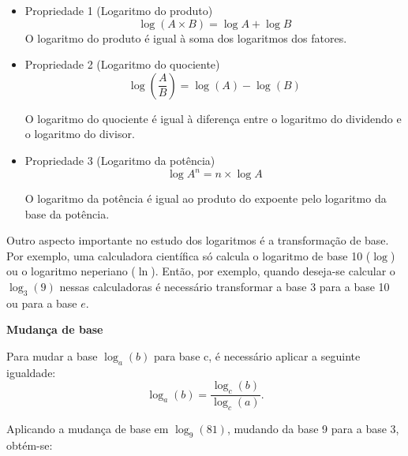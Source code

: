 	\begin{itemize}
		\item Propriedade 1 (Logaritmo do produto)
		\[
        \log (A \times B) = \log A + \log B
        \]
		O logaritmo do produto é igual à soma dos logaritmos dos fatores. 

        \begin{texample}
        \centering
        \end{texample}
       
		\item Propriedade 2 (Logaritmo do quociente)
		\[
        \log \left(\frac{A}{B}\right) = \log (A) - \log (B)
        \]
		
		O logaritmo do quociente é igual à diferença entre o logaritmo do dividendo e o logaritmo do divisor.
  
	  \begin{texample}
        \centering
        \end{texample}
        
		\item Propriedade 3 (Logaritmo da potência)
		\[
        \log A^n = n \times \log A
        \]
		
		O logaritmo da potência é igual ao produto do expoente pelo logaritmo da base da potência.

        \begin{texample}
        \centering
        \end{texample}
        
	\end{itemize}
	Outro aspecto importante no estudo dos logaritmos é a transformação de base. Por exemplo, uma calculadora científica só calcula o logaritmo de base 10 ($\log$) ou o logaritmo neperiano ($\ln$). Então, por exemplo, quando deseja-se calcular o $\log_3(9)$ nessas calculadoras é necessário transformar a base 3 para a base 10 ou para a base $e$.

    \noindent
	\textbf{Mudança de base}
	
	Para mudar a base $\log_a(b)$ para base c, é necessário aplicar a seguinte igualdade:
	\[\log_a(b) = \frac{\log_c(b)}{\log_c(a)}.\]

        Aplicando a mudança de base em $\log_9(81)$, mudando da base 9 para a base 3, obtém-se:
        
